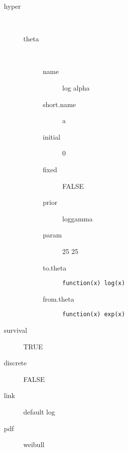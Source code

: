 \begin{description}
	\item[hyper]\ 
	 \begin{description}
	 	\item[theta]\ 
	 	 \begin{description}
	 	 	\item[name] log alpha
	 	 	\item[short.name] a
	 	 	\item[initial] 0
	 	 	\item[fixed] FALSE
	 	 	\item[prior] loggamma
	 	 	\item[param] 25 25
	 	 	\item[to.theta] \verb|function(x) log(x)|
	 	 	\item[from.theta] \verb|function(x) exp(x)|
	 	 \end{description}
	 \end{description}
	\item[survival] TRUE
	\item[discrete] FALSE
	\item[link] default log
	\item[pdf] weibull
\end{description}
